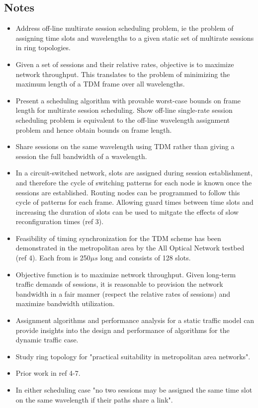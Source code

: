 \documentclass{article}
\begin{document}
\subsection{Notes}
\begin{itemize}
    \item Address off-line multirate session scheduling problem, ie the problem of assigning time slots and wavelengths to a given static set of multirate sessions in ring topologies.
    \item Given a set of sessions and their relative rates, objective is to maximize network throughput.  This translates to the problem of minimizing the maximum length of a TDM frame over all wavelengths.
    \item Present a scheduling algorithm with provable worst-case bounds on frame length for multirate session scheduling.  Show off-line single-rate session scheduling problem is equivalent to the off-line wavelength assignment problem and hence obtain bounds on frame length.
    \item Share sessions on the same wavelength using TDM rather than giving a session the full bandwidth of a wavelength.
    \item In a circuit-switched network, slots are assigned during session establishment, and therefore the cycle of switching patterns for each node is known once the sessions are established.  Routing nodes can be programmed to follow this cycle of patterns for each frame.  Allowing guard times between time slots and increasing the duration of slots can be used to mitgate the effects of slow reconfiguration times (ref 3).
    \item Feasibility of timing synchronization for the TDM scheme has been demonstrated in the metropolitan area by the All Optical Network testbed (ref 4).  Each from is 250$\mu s$ long and consists of 128 slots.
    \item Objective function is to maximize network throughput.  Given long-term traffic demands of sessions, it is reasonable to provision the network bandwidth in a fair manner (respect the relative rates of sessions) and maximize bandwidth utilization.
    \item Assignment algorithms and performance analysis for a static traffic model can provide insights into the design and performance of algorithms for the dynamic traffic case.
    \item Study ring topology for "practical suitability in metropolitan area networks".
    \item Prior work in ref 4-7.
    \item In either scheduling case "no two sessions may be assigned the same time slot on the same wavelength if their paths share a link".
\end{itemize}
\end{document}
